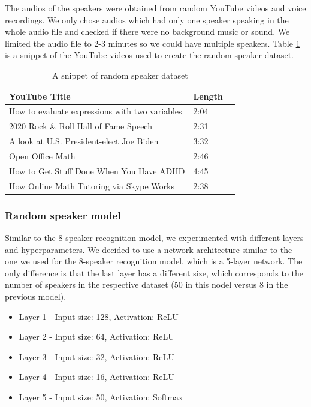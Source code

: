 \documentclass[10pt,twocolumn,letterpaper]{article}
\begin{document}
The audios of the speakers were obtained from random YouTube videos and voice recordings. We only chose audios which had only one speaker speaking in the whole audio file and checked if there were no background music or sound. We limited the audio file to 2-3 minutes so we could have multiple speakers. Table \ref{tab:random-speaker-dataset} is a snippet of the YouTube videos used to create the random speaker dataset.

\begin{table}[h]
        \begin{tabular}{|l|l|l|}
        \hline
        \textbf{YouTube Title}                                       & \textbf{Length} \\ \hline
        How to evaluate expressions with two variables               & 2:04                         \\ \hline
        2020 Rock \& Roll Hall of Fame Speech                        & 2:31                         \\ \hline
        A look at U.S. President-elect Joe Biden                     & 3:32                         \\ \hline
        Open Office Math                                             & 2:46                         \\ \hline
        How to Get Stuff Done When You Have ADHD                     & 4:45                         \\ \hline
        How Online Math Tutoring via Skype Works                     & 2:38                         \\ \hline
        \end{tabular}
        \caption{A snippet of random speaker dataset}
        \label{tab:random-speaker-dataset}
\end{table}

\subsubsection{Random speaker model}

Similar to the 8-speaker recognition model, we experimented with different layers and hyperparameters. We decided to use a network architecture similar to the one we used for the 8-speaker recognition model, which is a 5-layer network. The only difference is that the last layer has a different size, which corresponds to the number of speakers in the respective dataset (50 in this nodel versus 8 in the previous model).
\begin{itemize}[itemsep=-5pt]
    \item Layer 1 - Input size: 128, Activation: ReLU
    \item Layer 2 - Input size: 64, Activation: ReLU
    \item Layer 3 - Input size: 32, Activation: ReLU
    \item Layer 4 - Input size: 16, Activation: ReLU
    \item Layer 5 - Input size: 50, Activation: Softmax
\end{itemize}
\end{document}
